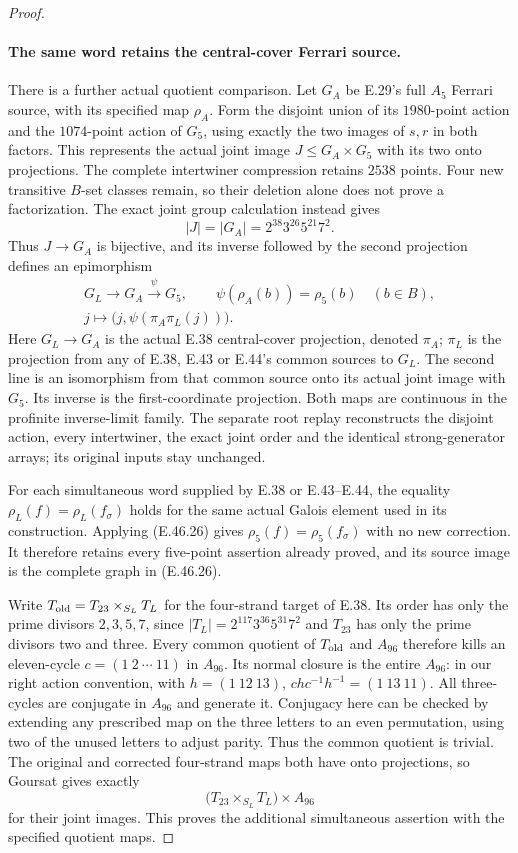 \begin{proof}
\paragraph{The same word retains the central-cover Ferrari source.}
There is a further actual quotient comparison.  Let $G_A$ be
E.29's full $A_5$ Ferrari source, with its specified map $\rho_A$.
Form the disjoint union of its $1980$-point action and the
$1074$-point action of $G_5$, using exactly the two images
of $s,r$ in both factors.  This represents the actual joint
image $J\le G_A\times G_5$ with its two onto projections.
The complete intertwiner compression retains $2538$ points.
Four new transitive $B$-set classes remain, so their deletion
alone does not prove a factorization.  The exact joint group
calculation instead gives
\[
 |J|=|G_A|=2^{38}3^{26}5^{21}7^2.
\]
Thus $J\to G_A$ is bijective, and its inverse followed by
the second projection defines an epimorphism
\[
 \begin{gathered}
 G_L\longrightarrow G_A\xrightarrow{\psi}G_5,
       \qquad \psi(\rho_A(b))=\rho_5(b)\quad(b\in B),\\
 j\longmapsto\bigl(j,\psi(\pi_A\pi_L(j))\bigr).
 \end{gathered}
 \tag{E.46.26}
\]
Here $G_L\to G_A$ is the actual E.38 central-cover
projection, denoted $\pi_A$; $\pi_L$ is the projection
from any of E.38, E.43 or E.44's common sources to $G_L$.
The second line is an isomorphism from that common source
onto its actual joint image with $G_5$.  Its inverse is
the first-coordinate projection.  Both maps are continuous
in the profinite inverse-limit family.
The separate root replay reconstructs the disjoint action,
every intertwiner, the exact joint order and the identical
strong-generator arrays; its original inputs stay unchanged.

For each simultaneous word supplied by E.38 or E.43--E.44,
the equality $\rho_L(f)=\rho_L(f_\sigma)$ holds for the
same actual Galois element used in its construction.
Applying \textup{(E.46.26)} gives
$\rho_5(f)=\rho_5(f_\sigma)$ with no new correction.
It therefore retains every five-point assertion already
proved, and its source image is the complete graph in
\textup{(E.46.26)}.

Write $T_{\rm old}=T_{23}\times_{S_L}T_L$ for the
four-strand target of E.38.  Its order has only the prime
divisors $2,3,5,7$, since
$|T_L|=2^{117}3^{36}5^{31}7^2$ and $T_{23}$ has only
the prime divisors two and three.  Every common quotient
of $T_{\rm old}$ and $A_{96}$ therefore kills an
eleven-cycle $c=(1\ 2\ \cdots\ 11)$ in $A_{96}$.
Its normal closure is the entire $A_{96}$: in our right
action convention, with $h=(1\ 12\ 13)$,
$chc^{-1}h^{-1}=(1\ 13\ 11)$.  All three-cycles
are conjugate in $A_{96}$ and generate it.
Conjugacy here can be checked by extending any prescribed
map on the three letters to an even permutation, using
two of the unused letters to adjust parity.
Thus the common quotient is trivial.  The original and
corrected four-strand maps both have onto projections,
so Goursat gives exactly
\[
              \bigl(T_{23}\times_{S_L}T_L\bigr)\times A_{96}
 \tag{E.46.27}
\]
for their joint images.  This proves the additional
simultaneous assertion with the specified quotient maps.


\end{proof}
